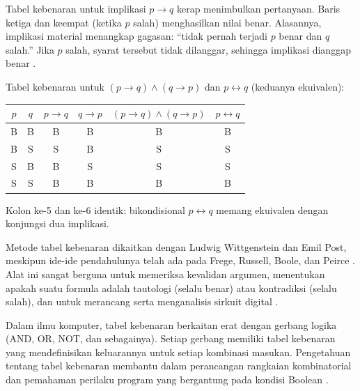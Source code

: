 Tabel kebenaran untuk implikasi $p \rightarrow q$ kerap menimbulkan pertanyaan. Baris ketiga dan keempat (ketika $p$ salah) menghasilkan nilai benar. Alasannya, implikasi material menangkap gagasan: ``tidak pernah terjadi $p$ benar dan $q$ salah.'' Jika $p$ salah, syarat tersebut tidak dilanggar, sehingga implikasi dianggap benar \cite{brilliant_truthtables,libretexts_logic}.

\begin{contoh}
Tabel kebenaran untuk $(p \rightarrow q) \wedge (q \rightarrow p)$ dan $p \leftrightarrow q$ (keduanya ekuivalen):

\begin{center}
\small
\begin{tabular}{|c|c|c|c|c|c|}
\hline
$p$ & $q$ & $p \rightarrow q$ & $q \rightarrow p$ & $(p \rightarrow q) \wedge (q \rightarrow p)$ & $p \leftrightarrow q$ \\
\hline
B & B & B & B & B & B \\
B & S & S & B & S & S \\
S & B & B & S & S & S \\
S & S & B & B & B & B \\
\hline
\end{tabular}
\end{center}
Kolon ke-5 dan ke-6 identik: bikondisional $p \leftrightarrow q$ memang ekuivalen dengan konjungsi dua implikasi.
\end{contoh}

Metode tabel kebenaran dikaitkan dengan Ludwig Wittgenstein dan Emil Post, meskipun ide-ide pendahulunya telah ada pada Frege, Russell, Boole, dan Peirce \cite{wiki_proplogic}. Alat ini sangat berguna untuk memeriksa kevalidan argumen, menentukan apakah suatu formula adalah tautologi (selalu benar) atau kontradiksi (selalu salah), dan untuk merancang serta menganalisis sirkuit digital \cite{uw_boolean,levin_discrete}.

Dalam ilmu komputer, tabel kebenaran berkaitan erat dengan gerbang logika (AND, OR, NOT, dan sebagainya). Setiap gerbang memiliki tabel kebenaran yang mendefinisikan keluarannya untuk setiap kombinasi masukan. Pengetahuan tentang tabel kebenaran membantu dalam perancangan rangkaian kombinatorial dan pemahaman perilaku program yang bergantung pada kondisi Boolean \cite{grinnell_logic,brilliant_truthtables}.

